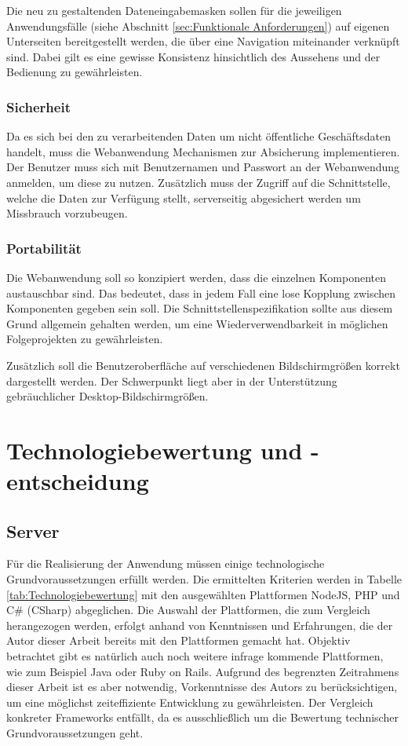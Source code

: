 Die neu zu gestaltenden Dateneingabemasken sollen für die jeweiligen Anwendungsfälle (siehe Abschnitt \ref{sec:Funktionale Anforderungen}) auf eigenen Unterseiten bereitgestellt werden, die über eine Navigation miteinander verknüpft sind. Dabei gilt es eine gewisse Konsistenz hinsichtlich des Aussehens und der Bedienung zu gewährleisten. 

\subsubsection{Sicherheit}

Da es sich bei den zu verarbeitenden Daten um nicht öffentliche Geschäftsdaten handelt, muss die Webanwendung Mechanismen zur Absicherung implementieren. Der Benutzer muss sich mit Benutzernamen und Passwort an der Webanwendung anmelden, um diese zu nutzen. Zusätzlich muss der Zugriff auf die Schnittstelle, welche die Daten zur Verfügung stellt, serverseitig abgesichert werden um Missbrauch vorzubeugen.

\subsubsection{Portabilität}

Die Webanwendung soll so konzipiert werden, dass die einzelnen Komponenten austauschbar sind. Das bedeutet, dass in jedem Fall eine lose Kopplung zwischen Komponenten gegeben sein soll. Die Schnittstellenspezifikation sollte aus diesem Grund allgemein gehalten werden, um eine Wiederverwendbarkeit in möglichen Folgeprojekten zu gewährleisten.

Zusätzlich soll die Benutzeroberfläche auf verschiedenen Bildschirmgrößen korrekt dargestellt werden. Der Schwerpunkt liegt aber in der Unterstützung gebräuchlicher Desktop-Bildschirmgrößen.

\section{Technologiebewertung und -entscheidung}
\label{sec:Analyse:Technologiebewertung und -entscheidung}

\subsection{Server}
\label{sec:Analyse:Server}

Für die Realisierung der Anwendung müssen einige technologische Grundvoraussetzungen erfüllt werden. Die ermittelten Kriterien werden in Tabelle \ref{tab:Technologiebewertung} mit den ausgewählten Plattformen NodeJS, PHP und C\# (CSharp) abgeglichen. Die Auswahl der Plattformen, die zum Vergleich herangezogen werden, erfolgt anhand von Kenntnissen und Erfahrungen, die der Autor dieser Arbeit bereits mit den Plattformen gemacht hat. Objektiv betrachtet gibt es natürlich auch noch weitere infrage kommende Plattformen, wie zum Beispiel Java oder Ruby on Rails. Aufgrund des begrenzten Zeitrahmens dieser Arbeit ist es aber notwendig, Vorkenntnisse des Autors zu berücksichtigen, um eine möglichst zeiteffiziente Entwicklung zu gewährleisten. Der Vergleich konkreter Frameworks entfällt, da es ausschließlich um die Bewertung technischer Grundvoraussetzungen geht.

